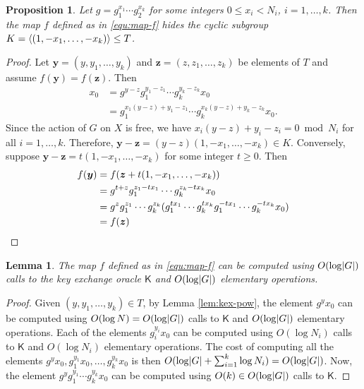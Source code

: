 \documentclass[11pt]{article}
\theoremstyle{plain}
\newtheorem{lemma}[theorem]{Lemma}
\newtheorem{proposition}[theorem]{Proposition}
\theoremstyle{definition}
\DeclarePairedDelimiter{\abs}{\lvert}{\rvert}
\DeclarePairedDelimiter{\lrang}{\langle}{\rangle}
\newcommand{\kex}{\mathsf{K}}
\begin{document}
\begin{proposition}
\label{prop:f-hide}
	Let $g = g_1^{x_1} \cdots g_2^{x_k}$ for some integers $0 \le x_i < N_i$, $i = 1, \dots, k$. 
	Then the map $f$ defined as in \eqref{equ:map-f} hides the cyclic subgroup $K = \lrang{(1, -x_1, 
	\dots, -x_k)} \le T$.
\end{proposition}
\begin{proof}
	Let $\bm{y} = (y, y_1, \dots, y_k)$ and $\bm{z} = (z, z_1, \dots, z_k)$ be elements of $T$ and 
	assume $f(\bm{y}) = f(\bm{z})$. Then
	\begin{align*}
		x_0 
		& = g^{y - z} g_1^{y_1 - z_1} \cdots g_k^{y_k - z_k} x_0 \\
		& = g_1^{x_1(y - z) + y_1 - z_1} \cdots g_k^{x_k(y - z) + y_k - z_k} x_0.
	\end{align*}
	Since the action of $G$ on $X$ is free, we have $x_i(y - z) + y_i - z_i = 0 \bmod N_i$ for all 
	$i = 1, \dots, k$. Therefore, $\bm{y} - \bm{z} = (y - z)(1, -x_1, \dots, -x_k) \in K$. 
	Conversely, suppose $\bm{y} - \bm{z} = t(1, -x_1, \dots, -x_k)$ for some integer $t \ge 0$. Then 
	\begin{align*}
		f(\bm{y}) 
		& = f(\bm{z} + t(1, -x_1, \dots, -x_k)) \\
		& = g^{t + z} g_1^{z_1 - tx_1} \cdots g_k^{z_k - tx_k}x_0 \\
		& = g^z g_1^{z_1} \cdots g_k^{z_k} (g_1^{tx_1} \cdots g_k^{tx_k} g_1^{-tx_1} \cdots 
		g_k^{-tx_k} x_0) \\
		& = f(\bm{z}) \qedhere
	\end{align*} 
\end{proof}

\begin{lemma}
	\label{lem:compute-f}
	The map $f$ defined as in \eqref{equ:map-f} can be computed using $O(\log \abs{G})$ calls to the 
	key exchange oracle $\kex$ and $O(\log \abs{G})$ elementary operations.
\end{lemma}
\begin{proof}
	Given $(y, y_1, \dots, y_k) \in T$, by Lemma \ref{lem:kex-pow}, the element $g^yx_0$ can be 
	computed using $O(\log N) = O(\log \abs{G})$ calls to $\kex$ and $O(\log \abs{G})$ elementary 
	operations. Each of the elements $g_i^{y_i}x_0$ can be computed using $O(\log N_i)$ calls to 
	$\kex$ and $O(\log N_i)$ elementary operations. The cost of computing all the elements $g^yx_0, 
	g_1^{y_1}x_0, \dots, g_k^{y_k}x_0$ is then $O(\log \abs{G} + \sum_{i = 1}^k \log N_i) = O(\log 
	\abs{G})$. Now, the element $g^y g_1^{y_1} \cdots g_k^{y_k}x_0$ can be computed using $O(k) \in 
	O(\log \abs{G})$ calls to $\kex$. 
\end{proof}
\end{document}
